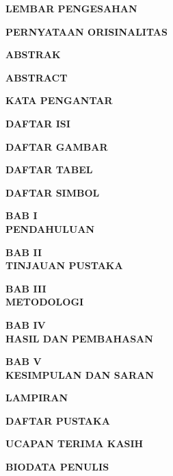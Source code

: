 \documentclass[12pt]{article}
\newcommand{\partition}[1]{
	\vspace*{\fill}
	\vspace*{\fill}
	\vspace*{\fill}
	\begin{flushright}
		\textbf{\Huge\MakeUppercase{#1}}
	\end{flushright}
	\vspace*{\fill}
	\vspace*{\fill}
	\clearpage
}
\begin{document}
	\partition{Lembar Pengesahan}
	\partition{Pernyataan Orisinalitas}
	\partition{Abstrak}
	\partition{Abstract}
	\partition{Kata Pengantar}
	\partition{Daftar Isi}
	\partition{Daftar Gambar}
	\partition{Daftar Tabel}
	\partition{Daftar Simbol}
	\partition{Bab I  \\ [.5em] Pendahuluan}
	\partition{Bab II \\ [.5em] Tinjauan Pustaka}
	\partition{Bab III\\ [.5em] Metodologi}
	\partition{Bab IV \\ [.5em] Hasil dan Pembahasan}
	\partition{Bab V  \\ [.5em] Kesimpulan dan Saran}
	\partition{Lampiran}
	\partition{Daftar Pustaka}
	\partition{Ucapan Terima Kasih}
	\partition{Biodata Penulis}
\end{document}
